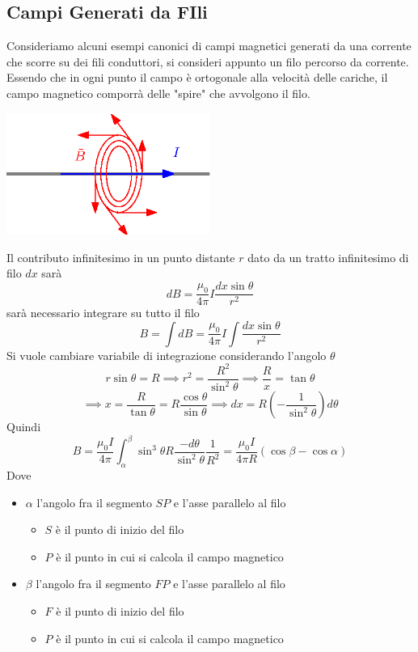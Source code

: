 \documentclass[10pt, letterpaper]{report}
\begin{document}
\subsection{Campi Generati da FIli}
Consideriamo alcuni esempi canonici di campi magnetici generati da una corrente che scorre su dei fili conduttori, si consideri appunto un filo percorso da corrente. Essendo che in ogni punto il campo è ortogonale alla velocità delle cariche, il campo magnetico comporrà delle "spire" che avvolgono il filo.
\begin{center}
    \includegraphics[width=0.5\textwidth ]{images/campoFIlo.eps}
\end{center}
Il contributo infinitesimo in un punto distante $r$ dato da un tratto infinitesimo di filo $dx$ sarà
$$ dB=\frac{\mu_0}{4\pi}I\frac{dx\sin\theta}{r^2}$$
sarà necessario integrare su tutto il filo 
$$B=\int dB=\frac{\mu_0}{4\pi}I\int\frac{dx\sin\theta}{r^2} $$
Si vuole cambiare variabile di integrazione considerando l'angolo $\theta$ 
$$ r\sin\theta =R \implies r^2=\frac{R^2}{\sin^2\theta}\implies \frac{R}{x}=\tan\theta$$
$$ \implies x=\frac{R}{\tan \theta}=R\frac{\cos\theta}{\sin\theta}\implies dx=R(-\frac{1}{\sin^2\theta})d\theta$$
Quindi 
$$ B=\frac{\mu_0I}{4\pi}\int_\alpha^\beta \sin^3\theta R\frac{-d\theta}{\sin^2\theta}\frac{1}{R^2}= 
\frac{\mu_0I}{4\pi R}(\cos\beta-\cos\alpha)$$
Dove \begin{itemize}
    \item $\alpha$ l'angolo fra il segmento $SP$ e l'asse parallelo al filo \begin{itemize}
        \item $S$ è il punto di inizio del filo 
        \item $P$ è il punto in cui si calcola il campo magnetico
    \end{itemize}
    \item $\beta$ l'angolo fra il segmento $FP$ e l'asse parallelo al filo \begin{itemize}
        \item $F$ è il punto di inizio del filo 
        \item $P$ è il punto in cui si calcola il campo magnetico
    \end{itemize}
\end{itemize}
\end{document}
